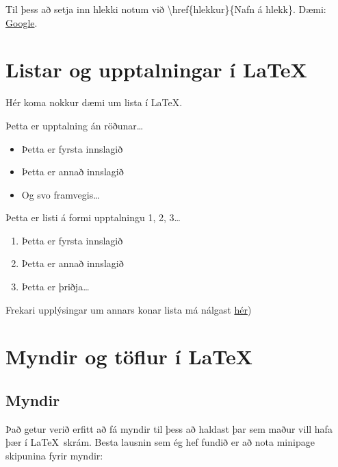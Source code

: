 \documentclass[a4paper]{article}
\begin{document}
Til þess að setja inn hlekki notum við \textbackslash href\{hlekkur\}\{Nafn á hlekk\}. Dæmi: \href{http://google.com}{Google}.


\section{Listar og upptalningar í \LaTeX}
Hér koma nokkur dæmi um lista í \LaTeX.


\noindent Þetta er upptalning án röðunar\dots

\begin{itemize}
  \item Þetta er fyrsta innslagið
  \item Þetta er annað innslagið
  \item Og svo framvegis\ldots
\end{itemize}

\noindent Þetta er listi á formi upptalningu 1, 2, 3\dots
\begin{enumerate}
  \item Þetta er fyrsta innslagið
  \item Þetta er annað innslagið
  \item Þetta er þriðja\ldots
\end{enumerate}

Frekari upplýsingar um annars konar lista má nálgast \href{http://en.wikibooks.org/wiki/LaTeX/List_Structures}{hér}) \\ %



\section{Myndir og töflur í \LaTeX}
\subsection{Myndir}
Það getur verið erfitt að fá myndir til þess að haldast þar sem maður vill hafa þær í \LaTeX\ skrám. Besta lausnin sem ég hef fundið er að nota minipage skipunina fyrir myndir:
\end{document}

